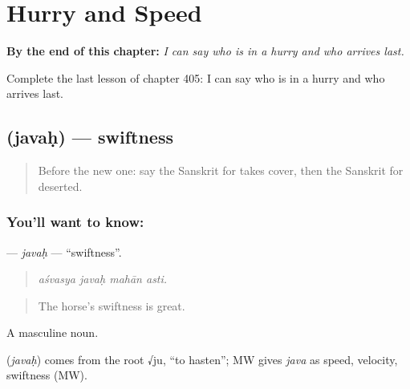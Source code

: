 
\chapter{Hurry and Speed}
\label{ch:sa-hurry-and-speed}

\begin{chapteropening}
\textbf{By the end of this chapter:} \emph{I can say who is in a hurry and who arrives last.}

Complete the last lesson of chapter 405: I can say who is in a hurry and who arrives last.
\end{chapteropening}

\section[\texorpdfstring{\sk{जवः} (javaḥ)}{जवः (javaḥ)}]{ (javaḥ) — swiftness}

\label{lesson:SA-C405-javah}



\begin{quote}
Before the new one: say the Sanskrit for takes cover, then the Sanskrit for deserted.
\end{quote}

\subsection*{You'll want to know: }
\textbf{} — \emph{javaḥ} — \textquotedblleft{}swiftness\textquotedblright{}.

\begin{quote}
   
\end{quote}

\begin{quote}
\emph{aśvasya javaḥ mahān asti.}
\end{quote}

\begin{quote}
The horse's swiftness is great.
\end{quote}

A masculine noun.

\begin{cousinweb}
\textbf{} (\emph{javaḥ}) comes from the root √ju, \textquotedblleft{}to hasten\textquotedblright{}; MW gives \emph{java} as speed, velocity, swiftness (MW).
\end{cousinweb}


